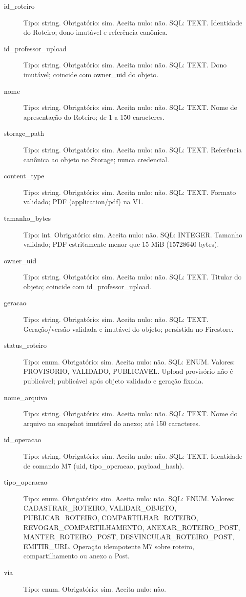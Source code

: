 \begin{description}
\item[id\_roteiro] Tipo: string. Obrigatório: sim. Aceita nulo: não.
SQL: TEXT.
Identidade do Roteiro; dono imutável e referência canônica.
\item[id\_professor\_upload] Tipo: string. Obrigatório: sim. Aceita nulo: não.
SQL: TEXT.
Dono imutável; coincide com owner\_uid do objeto.
\item[nome] Tipo: string. Obrigatório: sim. Aceita nulo: não.
SQL: TEXT.
Nome de apresentação do Roteiro; de 1 a 150 caracteres.
\item[storage\_path] Tipo: string. Obrigatório: sim. Aceita nulo: não.
SQL: TEXT.
Referência canônica ao objeto no Storage; nunca credencial.
\item[content\_type] Tipo: string. Obrigatório: sim. Aceita nulo: não.
SQL: TEXT.
Formato validado; PDF (application/pdf) na V1.
\item[tamanho\_bytes] Tipo: int. Obrigatório: sim. Aceita nulo: não.
SQL: INTEGER.
Tamanho validado; PDF estritamente menor que 15 MiB (15728640 bytes).
\item[owner\_uid] Tipo: string. Obrigatório: sim. Aceita nulo: não.
SQL: TEXT.
Titular do objeto; coincide com id\_professor\_upload.
\item[geracao] Tipo: string. Obrigatório: sim. Aceita nulo: não.
SQL: TEXT.
Geração/versão validada e imutável do objeto; persistida no Firestore.
\item[status\_roteiro] Tipo: enum. Obrigatório: sim. Aceita nulo: não.
SQL: ENUM.
Valores: PROVISORIO, VALIDADO, PUBLICAVEL.
Upload provisório não é publicável; publicável após objeto validado e geração fixada.
\item[nome\_arquivo] Tipo: string. Obrigatório: sim. Aceita nulo: não.
SQL: TEXT.
Nome do arquivo no snapshot imutável do anexo; até 150 caracteres.
\item[id\_operacao] Tipo: string. Obrigatório: sim. Aceita nulo: não.
SQL: TEXT.
Identidade de comando M7 (uid, tipo\_operacao, payload\_hash).
\item[tipo\_operacao] Tipo: enum. Obrigatório: sim. Aceita nulo: não.
SQL: ENUM.
Valores: CADASTRAR\_ROTEIRO, VALIDAR\_OBJETO, PUBLICAR\_ROTEIRO, COMPARTILHAR\_ROTEIRO, REVOGAR\_COMPARTILHAMENTO, ANEXAR\_ROTEIRO\_POST, MANTER\_ROTEIRO\_POST, DESVINCULAR\_ROTEIRO\_POST, EMITIR\_URL.
Operação idempotente M7 sobre roteiro, compartilhamento ou anexo a Post.
\item[via] Tipo: enum. Obrigatório: sim. Aceita nulo: não.

\end{description}
